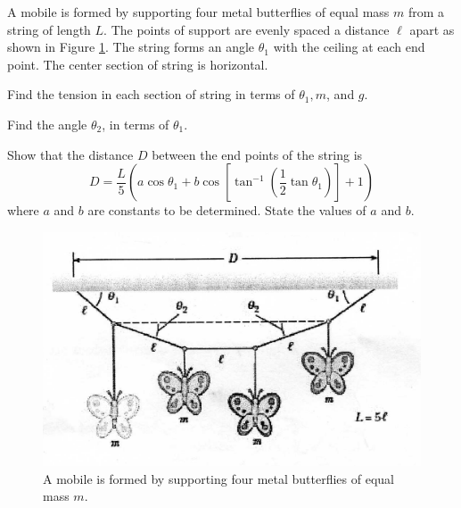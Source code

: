 \begin{problem}
A mobile is formed by supporting four metal butterflies of equal mass $m$ from a string of length $L$. The points of support are evenly spaced a distance $\ell$ apart as shown in Figure \ref{2010q3}. The string forms an angle $\theta_{1}$ with the ceiling at each end point. The center section of string is horizontal. 
    \begin{subproblem}
        Find the tension in each section of string in terms of $\theta_{1}, m$, and $g$.
    \end{subproblem}
    
    \begin{subproblem} 
        Find the angle $\theta_{2}$, in terms of $\theta_{1}$. 
    \end{subproblem}
    
    \begin{subproblem}
    Show that the distance $D$ between the end points of the string is
    \[D=\frac{L}{5}\left(a \cos \theta_{1}+b \cos \left[\tan ^{-1}\left(\frac{1}{2} \tan \theta_{1}\right)\right]+1\right)\]
    where $a$ and $b$ are constants to be determined. State the values of $a$ and $b$.
    \end{subproblem}

    \begin{figure}[h]
        \centering
        \includegraphics[width=\linewidth]{spho_book_TYS_images/2010q3.png}
        \caption{A mobile is formed by supporting four metal butterflies of equal mass $m$.} \label{2010q3}
    \end{figure}
\end{problem}

